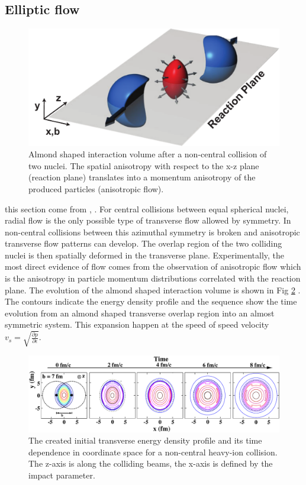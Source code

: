 \documentclass[12pt,a4paper]{book}
\begin{document}
	\subsection{Elliptic flow}
	\begin{figure}[ht]
		\centering
		\includegraphics[width=0.4\linewidth]{pictures/elliptic_flow_collision.pdf}
		\caption{Almond shaped interaction volume after a non-central collision of two nuclei. The spatial anisotropy with respect to the x-z plane (reaction plane) translates into a momentum anisotropy of the produced particles (anisotropic flow).}
		\label{fig:elliptic_flow_collision} 
	\end{figure}
	this section come from \cite{Snellings_2011}, \cite{heinz2004conceptsheavyionphysics} \cite{Kolb_2000}. 
	For central collisions between equal spherical nuclei, radial flow is the only possible type of transverse flow allowed by symmetry. In non-central collisions between this azimuthal symmetry is broken and anisotropic transverse flow patterns can develop. The overlap region of the two colliding nuclei is then spatially deformed in the transverse plane. Experimentally, the most direct evidence of flow comes from the observation of anisotropic flow which is the anisotropy in particle momentum distributions correlated with the reaction plane. The evolution of the almond shaped interaction volume is shown in Fig \ref{fig:time_evolution_perepheral} \cite{kolb2003hydrodynamicdescriptionultrarelativisticheavyion}. The contours indicate the energy density profile and the sequence show the time evolution from an almond shaped transverse overlap region into an almost symmetric system. This expansion happen at the speed of speed velocity $v_s=\sqrt{\frac{\partial p}{\partial \epsilon}}$. 
	\begin{figure}[ht]
		\centering
		\includegraphics[width=0.4\linewidth]{pictures/timeEvolutionPerepheral.pdf}
		\caption{The created initial transverse energy density profile and its time	dependence in coordinate space for a non-central heavy-ion collision. The z-axis is along the colliding beams, the x-axis is defined by the impact parameter.}
		\label{fig:time_evolution_perepheral} 
	\end{figure}
\end{document}
